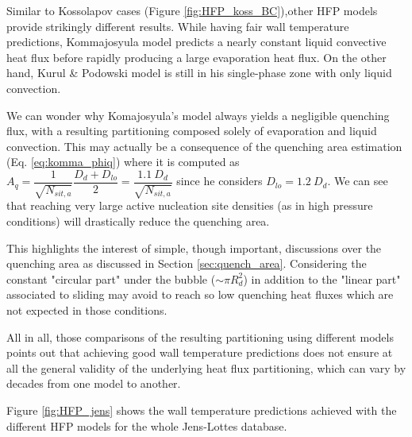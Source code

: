 Similar to Kossolapov cases (Figure \ref{fig:HFP_koss_BC}),other HFP models provide strikingly different results. While having fair wall temperature predictions, Kommajosyula model predicts a nearly constant liquid convective heat flux before rapidly producing a large evaporation heat flux. On the other hand, Kurul \& Podowski model is still in his single-phase zone with only liquid convection.

\begin{remark*}{}
We can wonder why Komajosyula's model always yields a negligible quenching flux, with a resulting partitioning composed solely of evaporation and liquid convection. This may actually be a consequence of the quenching area estimation (Eq. \ref{eq:komma_phiq}) where it is computed as $A_{q}=\dfrac{1}{\sqrt{N_{sit,a}}}\dfrac{D_{d}+D_{lo}}{2} = \dfrac{1.1~D_{d}}{\sqrt{N_{sit,a}}}$ since he considers $D_{lo}=1.2~D_{d}$. We can see that reaching very large active nucleation site densities (as in high pressure conditions) will drastically reduce the quenching area.

\npar

This highlights the interest of simple, though important, discussions over the quenching area as discussed in Section  \ref{sec:quench_area}. Considering the constant "circular part" under the bubble ($\sim \pi R_{d}^{2}$) in addition to the "linear part" associated to sliding may avoid to reach so low quenching heat fluxes which are not expected in those conditions.
\end{remark*}

All in all, those comparisons of the resulting partitioning using different models points out that achieving good wall temperature predictions does not ensure at all the general validity of the underlying heat flux partitioning, which can vary by decades from one model to another. 

\npar


Figure \ref{fig:HFP_jens} shows the wall temperature predictions achieved with the different HFP models for the whole Jens-Lottes database.

